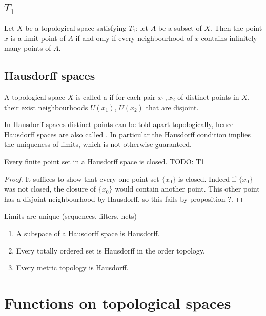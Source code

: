 \subsection{$T_1$}
\begin{proposition}
Let $X$ be a topological space satisfying $T_1$; let $A$ be a subset of $X$.
Then the point $x$ is a limit point of $A$ \textup{if and only if} every neighbourhood of $x$ contains infinitely many points of $A$.
\end{proposition}
\subsection{Hausdorff spaces}
\begin{definition}
A topological space $X$ is called a  if for each pair $x_1, x_2$ of distinct points in $X$, their exist neighbourhoods $U(x_1)$, $U(x_2)$ that are disjoint.
\end{definition}
In Hausdorff spaces distinct points can be told apart topologically, hence Hausdorff spaces are also called . In particular the Hausdorff condition implies the uniqueness of limits, which is not otherwise guaranteed.

\begin{proposition}
Every finite point set in a Hausdorff space is closed. TODO: T1
\end{proposition}
\begin{proof}
It suffices to show that every one-point set $\{x_0\}$ is closed. Indeed if $\{x_0\}$ was not closed, the closure of $\{x_0\}$ would contain another point. This other point has a disjoint neighbourhood by Hausdorff, so this fails by proposition ?.
\end{proof}
\begin{proposition}
Limits are unique (sequences, filters, nets)
\end{proposition}
\begin{lemma}
\begin{enumerate}
\item A subspace of a Hausdorff space is Hausdorff.
\item Every totally ordered set is Hausdorff in the order topology.
\item Every metric topology is Hausdorff.
\end{enumerate}
\end{lemma}



\section{Functions on topological spaces}
